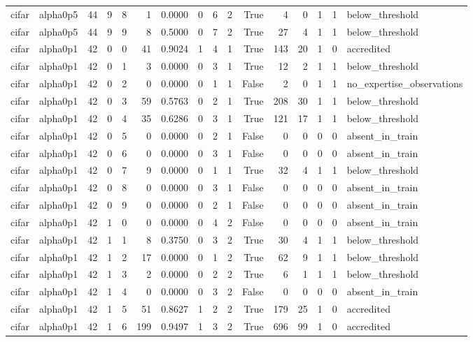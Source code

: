 \begin{tabular}{llrrrrrrrrrrrrrl}
cifar & alpha0p5 & 44 & 9 & 8 & 1 & 0.0000 & 0 & 6 & 2 & True & 4 & 0 & 1 & 1 & below\_threshold \\
cifar & alpha0p5 & 44 & 9 & 9 & 8 & 0.5000 & 0 & 7 & 2 & True & 27 & 4 & 1 & 1 & below\_threshold \\
cifar & alpha0p1 & 42 & 0 & 0 & 41 & 0.9024 & 1 & 4 & 1 & True & 143 & 20 & 1 & 0 & accredited \\
cifar & alpha0p1 & 42 & 0 & 1 & 3 & 0.0000 & 0 & 3 & 1 & True & 12 & 2 & 1 & 1 & below\_threshold \\
cifar & alpha0p1 & 42 & 0 & 2 & 0 & 0.0000 & 0 & 1 & 1 & False & 2 & 0 & 1 & 1 & no\_expertise\_observations \\
cifar & alpha0p1 & 42 & 0 & 3 & 59 & 0.5763 & 0 & 2 & 1 & True & 208 & 30 & 1 & 1 & below\_threshold \\
cifar & alpha0p1 & 42 & 0 & 4 & 35 & 0.6286 & 0 & 3 & 1 & True & 121 & 17 & 1 & 1 & below\_threshold \\
cifar & alpha0p1 & 42 & 0 & 5 & 0 & 0.0000 & 0 & 2 & 1 & False & 0 & 0 & 0 & 0 & absent\_in\_train \\
cifar & alpha0p1 & 42 & 0 & 6 & 0 & 0.0000 & 0 & 3 & 1 & False & 0 & 0 & 0 & 0 & absent\_in\_train \\
cifar & alpha0p1 & 42 & 0 & 7 & 9 & 0.0000 & 0 & 1 & 1 & True & 32 & 4 & 1 & 1 & below\_threshold \\
cifar & alpha0p1 & 42 & 0 & 8 & 0 & 0.0000 & 0 & 3 & 1 & False & 0 & 0 & 0 & 0 & absent\_in\_train \\
cifar & alpha0p1 & 42 & 0 & 9 & 0 & 0.0000 & 0 & 2 & 1 & False & 0 & 0 & 0 & 0 & absent\_in\_train \\
cifar & alpha0p1 & 42 & 1 & 0 & 0 & 0.0000 & 0 & 4 & 2 & False & 0 & 0 & 0 & 0 & absent\_in\_train \\
cifar & alpha0p1 & 42 & 1 & 1 & 8 & 0.3750 & 0 & 3 & 2 & True & 30 & 4 & 1 & 1 & below\_threshold \\
cifar & alpha0p1 & 42 & 1 & 2 & 17 & 0.0000 & 0 & 1 & 2 & True & 62 & 9 & 1 & 1 & below\_threshold \\
cifar & alpha0p1 & 42 & 1 & 3 & 2 & 0.0000 & 0 & 2 & 2 & True & 6 & 1 & 1 & 1 & below\_threshold \\
cifar & alpha0p1 & 42 & 1 & 4 & 0 & 0.0000 & 0 & 3 & 2 & False & 0 & 0 & 0 & 0 & absent\_in\_train \\
cifar & alpha0p1 & 42 & 1 & 5 & 51 & 0.8627 & 1 & 2 & 2 & True & 179 & 25 & 1 & 0 & accredited \\
cifar & alpha0p1 & 42 & 1 & 6 & 199 & 0.9497 & 1 & 3 & 2 & True & 696 & 99 & 1 & 0 & accredited \\

\end{tabular}
